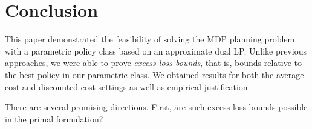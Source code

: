 \documentclass[11pt]{article}
\begin{document}
%
%

\section{Conclusion}
This paper demonstrated the feasibility of solving the MDP planning problem with a parametric policy class based on an approximate dual LP. Unlike previous approaches, we were able to prove \emph{excess loss bounds}, that is, bounds relative to the best policy in our parametric class. We obtained results for both the average cost and discounted cost settings as well as empirical justification.

There are several promising directions. First, are such excess loss bounds possible in the primal formulation?
\end{document}
